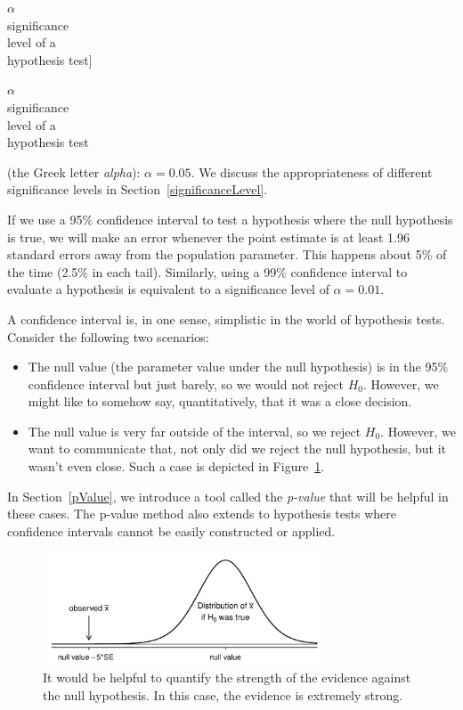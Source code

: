 $\alpha$\\\footnotesize significance\\level of a\\hypothesis test]{\raggedright\vspace{-4mm}

$\alpha$\\\footnotesize significance\\level of a\\hypothesis test} (the Greek letter \emph{alpha}): $\alpha = 0.05$. We discuss the appropriateness of different significance levels in Section~\ref{significanceLevel}.

If we use a 95\% confidence interval to test a hypothesis where the null hypothesis is true, we will make an error whenever the point estimate is at least 1.96 standard errors away from the population parameter. This happens about 5\% of the time (2.5\% in each tail). Similarly, using a 99\% confidence interval to evaluate a hypothesis is equivalent to a significance level of $\alpha = 0.01$.

A confidence interval is, in one sense, simplistic in the world of hypothesis tests. Consider the following two scenarios:
\begin{itemize}
\setlength{\itemsep}{0mm}
\item The null value (the parameter value under the null hypothesis) is in the 95\% confidence interval but just barely, so we would not reject $H_0$. However, we might like to somehow say, quantitatively, that it was a close decision.
\item The null value is very far outside of the interval, so we reject $H_0$. However, we want to communicate that, not only did we reject the null hypothesis, but it wasn't even close. Such a case is depicted in Figure~\ref{whyWeWantPValue}.
\end{itemize}
In Section~\ref{pValue}, we introduce a tool called the \emph{p-value} that will be helpful in these cases. The p-value method also extends to hypothesis tests where confidence intervals cannot be easily constructed or applied.

\begin{figure}[hht]
\centering
\includegraphics[width=0.75\textwidth]{ch_inference_foundations/figures/whyWeWantPValue/whyWeWantPValue}
\caption{It would be helpful to quantify the strength of the evidence against the null hypothesis. In this case, the evidence is extremely strong.}
\label{whyWeWantPValue}
\end{figure}


